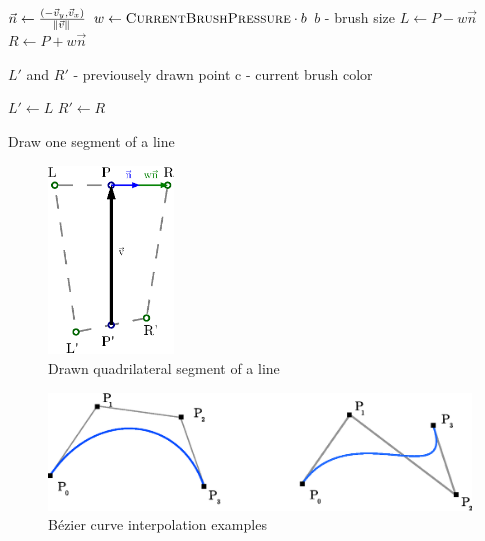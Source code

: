 \begin{pseudocode}
	\begin{algorithmic}
              \State $ \vec{n} \gets \frac{(-\vec{v}_y, \vec{v}_x)}{\norm{\vec{v}}} $        
              \State $ w \gets \Call{CurrentBrushPressure}{} \cdot b $ \Comment $b$ - brush size
              \State $L \gets P - w\vec{n}$
              \State $R \gets P + w\vec{n}$

              \State {}
              \State {} \Comment $L'$ and $R'$ - previousely drawn point
              \State {}
              \State {}
              \State {}
              \State {}
              \State {} \Comment c - current brush color

              \State $L' \gets L$
              \State $R' \gets R$
          \EndFunction
       \end{algorithmic}
  	   \caption{Draw one segment of a line\label{alg:draw-segment-quadrilateral}}      
   \end{pseudocode}

   
  \begin{figure}
  	\centering
      \includegraphics[height=50mm]{../img/draw-segment-quadrilateral.eps}
      \caption{Drawn quadrilateral segment of a line\label{fig:draw-segment-quadrilateral}}      
  \end{figure}


\begin{figure}
	\centering
  		\includegraphics[width=130mm]{../img/bezier_curves.eps}
  		\caption{Bézier curve interpolation examples\label{fig:bezier-curve}}  		
\end{figure}

